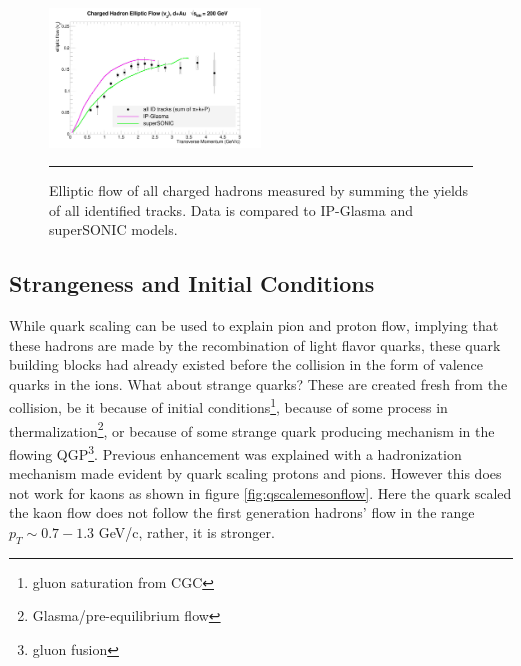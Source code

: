\begin{figure}[hbtp]
\centering    
    \includegraphics[width=0.5\textwidth]{results/v2hydro.jpg}
    \rule{35em}{0.5pt}
    \caption[Elliptic flow of all charged hadrons compared to hydrodynamic models.]{Elliptic flow of all charged hadrons measured by summing the yields of all identified tracks. Data is compared to IP-Glasma and superSONIC models.}
    \label{fig:allhadronhydro}
\end{figure}

\subsection{Strangeness and Initial Conditions}
While quark scaling can be used to explain pion and proton flow, implying that these hadrons are made by the recombination of light flavor quarks, these quark building blocks had already existed before the collision in the form of valence quarks in the ions. What about strange quarks? These are created fresh from the collision, be it because of initial conditions\footnote{gluon saturation from CGC}, because of some process in thermalization\footnote{Glasma/pre-equilibrium flow}, or because of some strange quark producing mechanism in the flowing QGP\footnote{gluon fusion}. Previous enhancement was explained with a hadronization mechanism made evident by quark scaling protons and pions. However this does not work for kaons as shown in figure \ref{fig:qscalemesonflow}. Here the quark scaled the kaon flow does not follow the first generation hadrons' flow in the range $p_T \sim 0.7-1.3$ GeV/c, rather, it is stronger.

